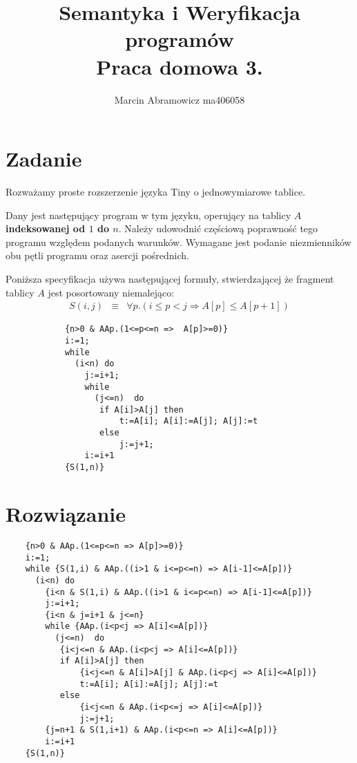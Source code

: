 \documentclass[final,12pt]{article}
\title{\vspace{-2cm}
Semantyka i Weryfikacja programów \\
\large Praca domowa 3.
}
\author{Marcin Abramowicz ma406058}
\begin{document}
   \maketitle

   \section{Zadanie}

   \lstset{language=whileprograms} 

   Rozważamy proste rozszerzenie języka {\sc Tiny} o jednowymiarowe
   tablice.

   Dany jest następujący program w tym języku, operujący na tablicy
   $A$ {\bf indeksowanej od $1$ do $n$}.
   Należy udowodnić częściową poprawność
   tego programu względem
   podanych warunków. Wymagane jest podanie niezmienników obu
   pętli programu oraz asercji pośrednich.

   Poniższa specyfikacja używa następującej formuły, stwierdzającej że fragment tablicy $A$ jest posortowany niemalejąco:
   \begin{eqnarray*}
      S(i,j) &\equiv&  \forall p. (i\leq p<j \Rightarrow A[p]\leq A[p+1])
   \end{eqnarray*}

   \begin{lstlisting}
            {n>0 & AAp.(1<=p<=n =>  A[p]>=0)}
            i:=1;
            while
              (i<n) do
                j:=i+1;
                while
                  (j<=n)  do
                   if A[i]>A[j] then
                       t:=A[i]; A[i]:=A[j]; A[j]:=t
                   else
                       j:=j+1;
                i:=i+1
            {S(1,n)}
   \end{lstlisting}


   \section{Rozwiązanie}

   \begin{lstlisting}
    {n>0 & AAp.(1<=p<=n => A[p]>=0)}
    i:=1;
    while {S(1,i) & AAp.((i>1 & i<=p<=n) => A[i-1]<=A[p])}
      (i<n) do
        {i<n & S(1,i) & AAp.((i>1 & i<=p<=n) => A[i-1]<=A[p])}
        j:=i+1;
        {i<n & j=i+1 & j<=n}
        while {AAp.(i<p<j => A[i]<=A[p])}
          (j<=n)  do
           {i<j<=n & AAp.(i<p<j => A[i]<=A[p])}
           if A[i]>A[j] then
               {i<j<=n & A[i]>A[j] & AAp.(i<p<j => A[i]<=A[p])}
               t:=A[i]; A[i]:=A[j]; A[j]:=t
           else
               {i<j<=n & AAp.(i<p<=j => A[i]<=A[p])}
               j:=j+1;
        {j=n+1 & S(1,i+1) & AAp.(i<p<=n => A[i]<=A[p])}
        i:=i+1
    {S(1,n)}
   \end{lstlisting}
\end{document}
